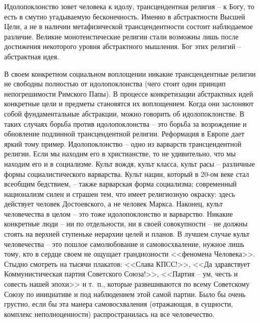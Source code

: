 \documentclass{book}
\begin{document}
Идолопоклонство зовет человека к идолу, трансцендентная религия -- к Богу, то есть в смутно угадываемую бесконечность. Именно в абстрактности Высшей Цели, а не в наличии мета­физической трансцендентности состоит наблюдаемое разли­чие. Великие монотеистические религии стали возможны лишь после достижения некоторого уровня абстрактного мышления. Бог этих религий -- абстрактная идея.

В своем конкретном социальном воплощении никакие транс­цендентные религии не свободны полностью от идолопоклонст­ва (чего стоит один принцип непогрешимости Римского Папы). В процессе конкретизации абстрактных идей конкретные цели и предметы становятся их воплощением. Когда они засло­няют собой фундаментальные абстракции, можно говорить об идолопоклонстве. В таких случаях борьба против идоло­поклонства -- это борьба за возрождение и обновление подлин­ной трансцендентной религии. Реформация в Европе дает яркий тому пример. Идолопоклонство -- одно из варварств трансцен­дентной религии. Если мы находим его в христианстве, то не удивительно, что мы находим его и в социализме. Культ вождя, культ класса, культ расы -- различные формы социалистиче­ского варварства. Культ нации, который в 20-ом веке стал всеоб­щим бедствием, -- также варварская форма социализма; совре­менный национализм силен и страшен тем, что имеет религиоз­ную окраску: здесь действует человек Достоевского, а не чело­век Маркса. Наконец, культ 
человечества в целом -- это тоже идолопоклонство и варварство. Никакие конкретные люди -- ни по отдельности, ни в своей совокупности -- не должны стоять на верхней ступеньке иерархии целей и планов. В лучшем слу­чае культ человечества -- это пошлое самолюбование и само­восхваление, нужное лишь тому, кто в сердце своем не ощуща­ет грандиозности <<феномена Человека>>. Стыдно смотреть на тысячи плакатов: <<Слава КПСС!>>, <<Да здравствует Коммуни­стическая партия Советского Союза!>>, <<Партия -- ум, честь и совесть нашей эпохи>> и т.~п., которые развешиваются по всему Советскому Союзу по инициативе и под наблюдением этой са­мой партии. Было бы очень грустно, если бы эта манера само­восхваления (отражающая, в сущности, комплекс неполноцен­ности) распространилась на все человечество.
\end{document}
